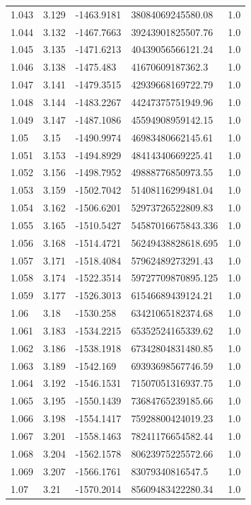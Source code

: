 \begin{tabular}{lllll}
1.043 & 3.129 & -1463.9181 & 38084069245580.08 & 1.0 \\
1.044 & 3.132 & -1467.7663 & 39243901825507.76 & 1.0 \\
1.045 & 3.135 & -1471.6213 & 40439056566121.24 & 1.0 \\
1.046 & 3.138 & -1475.483 & 41670609187362.3 & 1.0 \\
1.047 & 3.141 & -1479.3515 & 42939668169722.79 & 1.0 \\
1.048 & 3.144 & -1483.2267 & 44247375751949.96 & 1.0 \\
1.049 & 3.147 & -1487.1086 & 45594908959142.15 & 1.0 \\
1.05 & 3.15 & -1490.9974 & 46983480662145.61 & 1.0 \\
1.051 & 3.153 & -1494.8929 & 48414340669225.41 & 1.0 \\
1.052 & 3.156 & -1498.7952 & 49888776850973.55 & 1.0 \\
1.053 & 3.159 & -1502.7042 & 51408116299481.04 & 1.0 \\
1.054 & 3.162 & -1506.6201 & 52973726522809.83 & 1.0 \\
1.055 & 3.165 & -1510.5427 & 54587016675843.336 & 1.0 \\
1.056 & 3.168 & -1514.4721 & 56249438828618.695 & 1.0 \\
1.057 & 3.171 & -1518.4084 & 57962489273291.43 & 1.0 \\
1.058 & 3.174 & -1522.3514 & 59727709870895.125 & 1.0 \\
1.059 & 3.177 & -1526.3013 & 61546689439124.21 & 1.0 \\
1.06 & 3.18 & -1530.258 & 63421065182374.68 & 1.0 \\
1.061 & 3.183 & -1534.2215 & 65352524165339.62 & 1.0 \\
1.062 & 3.186 & -1538.1918 & 67342804831480.85 & 1.0 \\
1.063 & 3.189 & -1542.169 & 69393698567746.59 & 1.0 \\
1.064 & 3.192 & -1546.1531 & 71507051316937.75 & 1.0 \\
1.065 & 3.195 & -1550.1439 & 73684765239185.66 & 1.0 \\
1.066 & 3.198 & -1554.1417 & 75928800424019.23 & 1.0 \\
1.067 & 3.201 & -1558.1463 & 78241176654582.44 & 1.0 \\
1.068 & 3.204 & -1562.1578 & 80623975225572.66 & 1.0 \\
1.069 & 3.207 & -1566.1761 & 83079340816547.5 & 1.0 \\
1.07 & 3.21 & -1570.2014 & 85609483422280.34 & 1.0 \\

\end{tabular}

